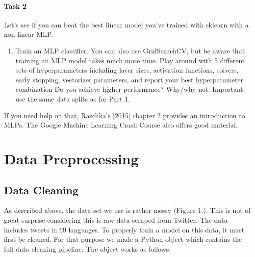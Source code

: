 \documentclass[fleqn,10pt]{SelfArx} %
\begin{document}
\paragraph{Task 2} Let’s see if you can beat the best linear model you’ve trained with sklearn with a non-linear MLP. 
\begin{enumerate}[noitemsep] 
	\item Train an MLP classifier. You can also use GridSearchCV, but be aware that training an MLP model takes much more time. Play around with 5 different sets of hyperparameters including layer sizes, activation functions, solvers, early stopping, vectorizer parameters, and report your best hyperparameter combination Do you achieve higher performance? Why/why not. Important: use the same data splits as for Part 1.
\end{enumerate}
If you need help on that, Raschka’s [2015] chapter 2 provides an introduction to MLPs. The Google Machine Learning Crash Course also offers good material. 


\section{Data Preprocessing}

\subsection{Data Cleaning}


As described above, the data set we use is rather messy (Figure 1.). This is not of great surprise considering this is raw data scraped from Twitter. The data includes tweets in 69 languages. To properly train a model on this data, it must first be cleaned. For that purpose we made a Python object which contains the full data cleaning pipeline. The object works as follows:
\end{document}
